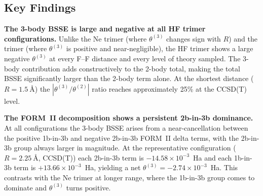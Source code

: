 \subsection{Key Findings}

\begin{finding_box}
\textbf{The 3-body BSSE is large and negative at all HF trimer
configurations.}
Unlike the Ne trimer (where $\theta^{(3)}$ changes sign with $R$) and
the  trimer (where $\theta^{(3)}$ is positive and
near-negligible), the HF trimer shows a large negative $\theta^{(3)}$
at every F--F distance and every level of theory sampled. The 3-body
contribution adds constructively to the 2-body total, making the total
BSSE significantly larger than the 2-body term alone. At the shortest
distance ($R = \SI{1.5}{\angstrom}$) the $|\theta^{(3)}/\theta^{(2)}|$
ratio reaches approximately 25\% at the CCSD(T) level.
\end{finding_box}

\begin{finding_box}
\textbf{The FORM~II decomposition shows a persistent 2b-in-3b
dominance.}
At all configurations the 3-body BSSE arises from a near-cancellation
between the positive 1b-in-3b and negative 2b-in-3b FORM~II delta
terms, with the 2b-in-3b group always larger in magnitude. At the
representative configuration ($R = \SI{2.25}{\angstrom}$, CCSD(T))
each 2b-in-3b term is $-14.58 \times 10^{-3}$~Ha and each 1b-in-3b
term is $+13.66 \times 10^{-3}$~Ha, yielding a net
$\theta^{(3)} = -2.74 \times 10^{-3}$~Ha. This contrasts with the
Ne trimer at longer range, where the 1b-in-3b group comes to dominate
and $\theta^{(3)}$ turns positive.
\end{finding_box}

\clearpage